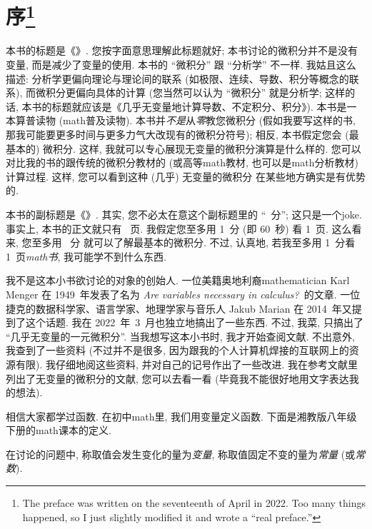 \chapter[序]{序\footnote{The preface was written
      on the seventeenth of April in 2022.
      Too many things happened,
      so I just slightly modified it
      and wrote a ``real preface.''}}

本书的标题是《\thetitle{}》.
您按字面意思理解此标题就好;
本书讨论的微积分并不是没有变量, 而是减少了变量的使用.
本书的 ``微积分'' 跟 ``分析学'' 不一样.
我姑且这么描述:
分析学更偏向理论与理论间的联系
(如极限、连续、导数、积分等概念的联系),
而微积分更偏向具体的计算
(您当然可以认为 ``微积分'' 就是分析学;
这样的话,
本书的标题就应该是《几乎无变量地计算导数、不定积分、积分》).
本书是一本算普读物 (\gls{math}普及读物).
本书并\emph{不是}从\emph{零}教您微积分
(假如我要写这样的书,
那我可能要更多时间与更多力气大改现有的微积分符号);
相反, 本书假定您会 (最基本的) 微积分.
这样, 我就可以专心展现无变量的微积分演算是什么样的.
您可以对比我的书的跟传统的微积分教材的
(或高等\gls{math}教材, 也可以是\gls{math}分析教材)
计算过程.
这样, 您可以看到这种 (几乎) 无变量的微积分%
在某些地方确实是有优势的.

本书的副标题是《\thesubtitle{}》.
其实, 您不必太在意这个副标题里的
``\pageref{calculus:LastPage}~分'';
这只是一个\gls{joke}.
事实上, 本书的正文就只有 \pageref{calculus:LastPage}~页.
我假定您至多用 1~分 (即 60~秒) 看 1~页.
这么看来, 您至多用 \pageref{calculus:LastPage}~分%
就可以了解最基本的微积分.
不过, 认真地, 若我至多用 1~分看 1~页\emph{\gls{math}书},
我可能学不到什么东西.

我不是这本小书欲讨论的对象的创始人.
一位美籍奥地利裔\gls{mathematician} Karl Menger
在 1949~年发表了名为
\textit{Are variables necessary in calculus?}\ 的文章.
一位捷克的数据科学家、语言学家、地理学家与音乐人
Jakub Marian 在 2014~年又提到了这个话题.
我在 2022~年~3~月也独立地搞出了一些东西.
不过, 我菜, 只搞出了 ``几乎无变量的一元微积分''.
当我想写这本小书时, 我才开始查阅文献.
不出意外, 我查到了一些资料
(不过并不是很多, 因为跟我的个人计算机焊接的互联网上的资源有限).
我仔细地阅这些资料, 并对自己的记号作出了一些改进.
我在参考文献里列出了无变量的微积分的文献, 您可以去看一看
(毕竟我不能很好地用文字表达我的想法).

相信大家都学过函数.
在初中\gls{math}里, 我们用变量定义函数.
下面是湘教版八年级下册的\gls{math}课本的定义.

\begin{definition*}
    在讨论的问题中,
    称取值会发生变化的量为\emph{变量},
    称取值固定不变的量为\emph{常量} (或\emph{常数}).
\end{definition*}

